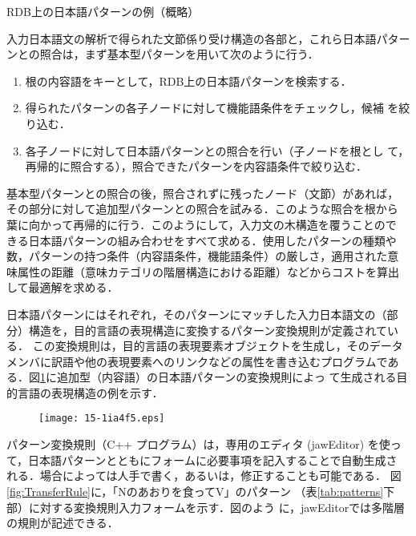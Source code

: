 \documentclass[japanese]{jnlp_1.4}
\begin{document}
\begin{table}[t]
  \caption{RDB上の日本語パターンの例（概略）}
  \label{tab:patterns}
  \centering

\end{table}

入力日本語文の解析で得られた文節係り受け構造の各部と，これら日本語パター
ンとの照合は，まず基本型パターンを用いて次のように行う．

\begin{enumerate}
\item 根の内容語をキーとして，RDB上の日本語パターンを検索する．
\item 得られたパターンの各子ノードに対して機能語条件をチェックし，候補
  を絞り込む．
\item 各子ノードに対して日本語パターンとの照合を行い（子ノードを根とし
  て，再帰的に照合する），照合できたパターンを内容語条件で絞り込む．
\end{enumerate}

基本型パターンとの照合の後，照合されずに残ったノード（文節）があれば，
その部分に対して追加型パターンとの照合を試みる．このような照合を根から
葉に向かって再帰的に行う．このようにして，入力文の木構造を覆うことので
きる日本語パターンの組み合わせをすべて求める．使用したパターンの種類や
数，パターンの持つ条件（内容語条件，機能語条件）の厳しさ，適用された意
味属性の距離（意味カテゴリの階層構造における距離）などからコストを算出
して最適解を求める．

日本語パターンにはそれぞれ，そのパターンにマッチした入力日本語文の（部
分）構造を，目的言語の表現構造に変換するパターン変換規則が定義されている．
この変換規則は，目的言語の表現要素オブジェクトを生成し，そのデータ
メンバに訳語や他の表現要素へのリンクなどの属性を書き込むプログラムであ
る．図\ref{fig:ITtoET}に追加型（内容語）の日本語パターンの変換規則によっ
て生成される目的言語の表現構造の例を示す．

\begin{figure}[t]
  \centering
      \texttt{[image: 15-1ia4f5.eps]}
  \label{fig:ITtoET}
\end{figure}

パターン変換規則（C++ プログラム）は，専用のエディタ (jawEditor) を使っ
て，日本語パターンとともにフォームに必要事項を記入することで自動生成さ
れる．場合によっては人手で書く，あるいは，修正することも可能である．
図\ref{fig:TransferRule}に，「Nのあおりを食ってV」のパターン
（表\ref{tab:patterns}下部）に対する変換規則入力フォームを示す．図のよう
に，jawEditorでは多階層の規則が記述できる．
\end{document}
